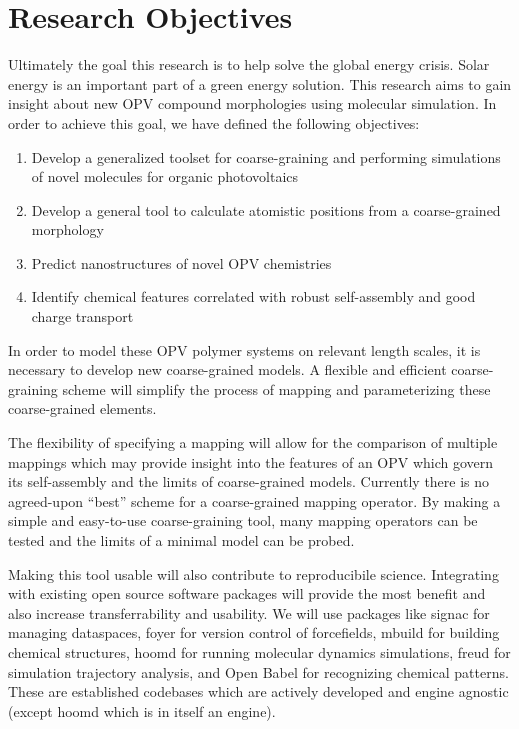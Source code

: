 \section*{Research Objectives}

Ultimately the goal this research is to help solve the global energy crisis. 
Solar energy is an important part of a green energy solution.
This research aims to gain insight about new OPV compound morphologies using molecular simulation.
In order to achieve this goal, we have defined the following objectives:
\begin{enumerate}
    \item {Develop a generalized toolset for coarse-graining and performing simulations of novel molecules for organic photovoltaics}
    \item {Develop a general tool to calculate atomistic positions from a coarse-grained morphology}
    \item {Predict nanostructures of novel OPV chemistries}
    \item {Identify chemical features correlated with robust self-assembly and good charge transport}
\end{enumerate}

In order to model these OPV polymer systems on relevant length scales, it is necessary to develop new coarse-grained models.
A flexible and efficient coarse-graining scheme will simplify the process of mapping and parameterizing these coarse-grained elements.

The flexibility of specifying a mapping will allow for the comparison of multiple mappings which may provide insight into the features of an OPV which govern its self-assembly and the limits of coarse-grained models.
Currently there is no agreed-upon ``best'' scheme for a coarse-grained mapping operator.
By making a simple and easy-to-use coarse-graining tool, many mapping operators can be tested and the limits of a minimal model can be probed.

Making this tool usable will also contribute to reproducibile science. 
Integrating with existing open source software packages will provide the most benefit and also increase transferrability and usability.
We will use packages like signac for managing dataspaces, foyer for version control of forcefields, mbuild for building chemical structures, hoomd for running molecular dynamics simulations, freud for simulation trajectory analysis, and Open Babel for recognizing chemical patterns\cite{signac, foyer, mbuild, hoomd, freud, openbabel}.
These are established codebases which are actively developed and engine agnostic (except hoomd which is in itself an engine).

